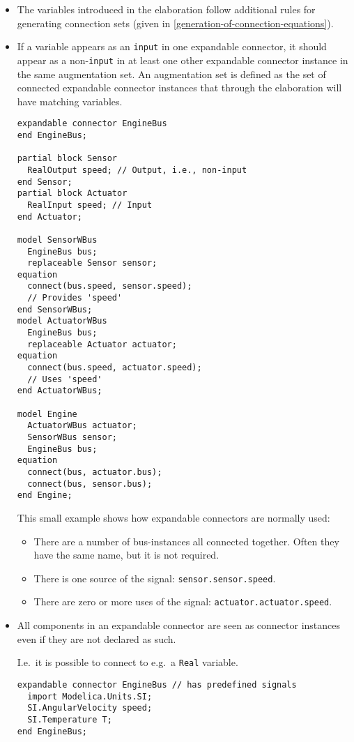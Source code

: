 \begin{itemize}
\item
  The variables introduced in the elaboration follow additional rules for generating connection sets (given in \cref{generation-of-connection-equations}).

\item
  If a variable appears as an \lstinline!input! in one expandable connector, it should appear as a non-\lstinline!input! in at least one other expandable connector instance in the same augmentation set.
  An augmentation set is defined as the set of connected expandable connector instances that through the elaboration will have matching variables.
\begin{example}
\begin{lstlisting}[language=modelica]
expandable connector EngineBus
end EngineBus;

partial block Sensor
  RealOutput speed; // Output, i.e., non-input
end Sensor;
partial block Actuator
  RealInput speed; // Input
end Actuator;

model SensorWBus
  EngineBus bus;
  replaceable Sensor sensor;
equation 
  connect(bus.speed, sensor.speed); 
  // Provides 'speed'
end SensorWBus;
model ActuatorWBus
  EngineBus bus;
  replaceable Actuator actuator;
equation 
  connect(bus.speed, actuator.speed);
  // Uses 'speed'
end ActuatorWBus;
  
model Engine
  ActuatorWBus actuator;
  SensorWBus sensor;
  EngineBus bus;
equation 
  connect(bus, actuator.bus);
  connect(bus, sensor.bus);
end Engine;
\end{lstlisting}
This small example shows how expandable connectors are normally used:
\begin{itemize}
\item There are a number of bus-instances all connected together.
Often they have the same name, but it is not required.
\item There is one source of the signal: \lstinline!sensor.sensor.speed!.
\item There are zero or more uses of the signal:  \lstinline!actuator.actuator.speed!.
\end{itemize}
\end{example}

\item
  All components in an expandable connector are seen as connector instances even if they are not declared as such.
  \begin{nonnormative}
  I.e.\ it is possible to connect to e.g.\ a \lstinline!Real! variable.
  \end{nonnormative}
\begin{example}
\begin{lstlisting}[language=modelica]
expandable connector EngineBus // has predefined signals
  import Modelica.Units.SI;
  SI.AngularVelocity speed;
  SI.Temperature T;
end EngineBus;


\end{lstlisting}
\end{example}
\end{itemize}
